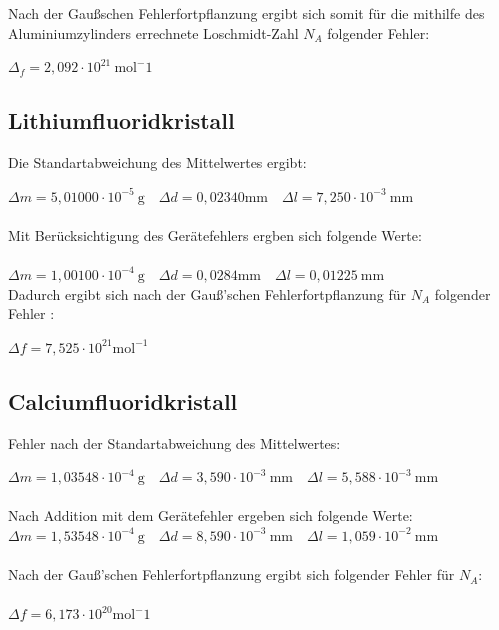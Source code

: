 \documentclass[12pt,a4paper,titlepage,headinclude,bibtotoc]{scrartcl}
\begin{document}
Nach der Gaußschen Fehlerfortpflanzung ergibt sich somit für die mithilfe des Aluminiumzylinders errechnete Loschmidt-Zahl $N_A$ folgender Fehler:\\

\vspace{3mm}

$\Delta_f = 2,092\cdot10^{21}\ \mathrm{mol^-1}$


\subsection{Lithiumfluoridkristall}

Die Standartabweichung des Mittelwertes ergibt:\\

\vspace{3mm}

$\Delta m = 5,01000\cdot10^{-5} \ \mathrm{g} \quad \Delta d= 0,02340  \mathrm{mm} \quad \Delta l = 7,250 \cdot 10^{-3}\ \mathrm{mm}$\\
\\
Mit Berücksichtigung des Gerätefehlers ergben sich folgende Werte:\\
\\
$\Delta m = 1,00100\cdot10^{-4} \ \mathrm{g} \quad \Delta d= 0,0284 \mathrm{mm} \quad \Delta l = 0,01225 \ \mathrm{mm}$\\

Dadurch ergibt sich nach der Gauß'schen Fehlerfortpflanzung für $N_A$ folgender Fehler :\\

\vspace{3mm}

$\Delta f= 7,525 \cdot 10^{21} \mathrm{mol^{-1}}$



\subsection{Calciumfluoridkristall}

Fehler nach der Standartabweichung des Mittelwertes: 
\vspace{3mm}

$\Delta m = 1,03548\cdot10^{-4} \ \mathrm{g} \quad \Delta d= 3,590 \cdot 10^{-3} \ \mathrm{mm} \quad \Delta l = 5,588 \cdot 10^{-3}\ \mathrm{mm}$\\
\\
Nach Addition mit dem Gerätefehler ergeben sich folgende Werte:
\\
$\Delta m = 1,53548\cdot10^{-4} \ \mathrm{g} \quad \Delta d= 8,590 \cdot 10^{-3} \ \mathrm{mm} \quad \Delta l = 1,059 \cdot 10^{-2}\ \mathrm{mm}$\\
\\
Nach der Gauß'schen Fehlerfortpflanzung ergibt sich folgender Fehler für $N_A$:\\
\\
$\Delta f =6,173 \cdot 10^{20} \mathrm{mol^-1}$
\end{document}
